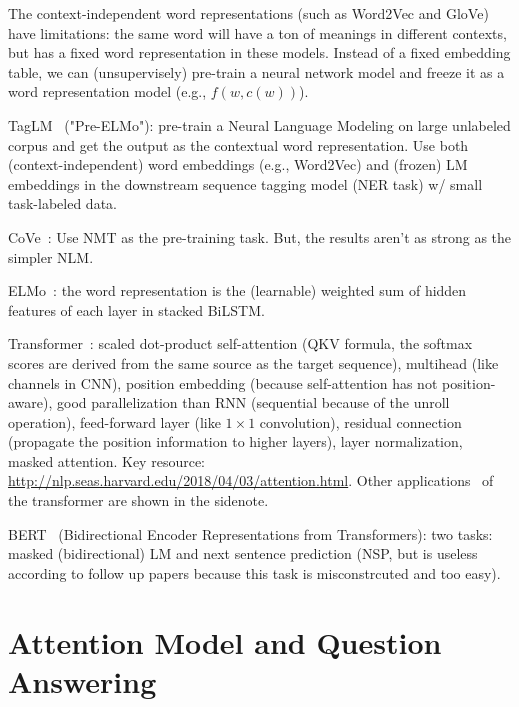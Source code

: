 The context-independent word representations (such as Word2Vec and GloVe) have limitations: the same word will have a ton of meanings in different contexts, but has a fixed word representation in these models.
Instead of a fixed embedding table, we can (unsupervisely) pre-train a neural network model and freeze it as a word representation model (e.g., $f(w, c(w))$).

TagLM~ ("Pre-ELMo"): pre-train a Neural Language Modeling on large unlabeled corpus and get the output as the contextual word representation. Use both (context-independent) word embeddings (e.g., Word2Vec) and (frozen) LM embeddings in the downstream sequence tagging model (NER task) w/ small task-labeled data.

CoVe~: Use NMT as the pre-training task. But, the results aren't as strong as the simpler NLM.

ELMo~: the word representation is the (learnable) weighted sum of hidden features of each layer in stacked BiLSTM.

Transformer~: scaled dot-product self-attention (QKV formula, the softmax scores are derived from the same source as the target sequence), multihead (like channels in CNN), position embedding (because self-attention has not position-aware), good parallelization than RNN (sequential because of the unroll operation), feed-forward layer (like $1\times 1$ convolution), residual connection (propagate the position information to higher layers), layer normalization, masked attention.
Key resource: \url{http://nlp.seas.harvard.edu/2018/04/03/attention.html}.
Other applications~ of the transformer are shown in the sidenote.

BERT~ (Bidirectional Encoder Representations from Transformers): two tasks: masked (bidirectional) LM and next sentence prediction (NSP, but is useless according to follow up papers because this task is misconstrcuted and too easy).



\section{Attention Model and Question Answering}

